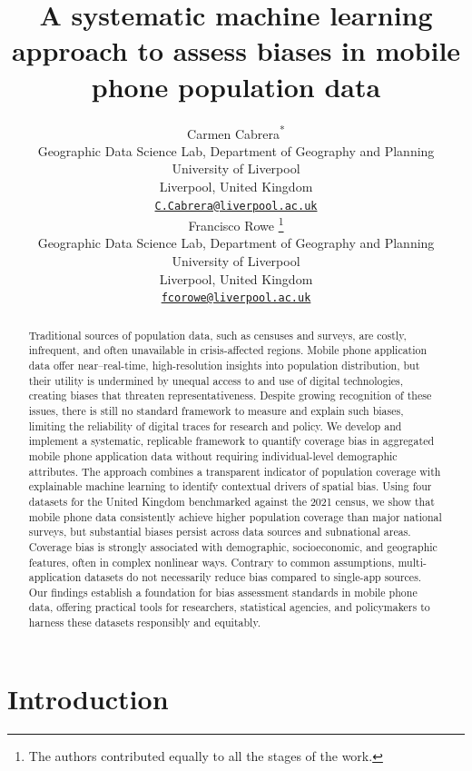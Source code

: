 \documentclass{article}
\title{A systematic machine learning approach to assess biases in mobile phone population data}
\author{
    Carmen Cabrera\textsuperscript{*}
   \\
    Geographic Data Science Lab, Department of Geography and Planning \\
    University of Liverpool \\
  Liverpool, United Kingdom \\
  \texttt{\href{mailto:C.Cabrera@liverpool.ac.uk}{\nolinkurl{C.Cabrera@liverpool.ac.uk}}} \\
   \And
    Francisco Rowe
    \thanks{The authors contributed equally to all the stages of the work.}
   \\
    Geographic Data Science Lab, Department of Geography and Planning \\
    University of Liverpool \\
  Liverpool, United Kingdom \\
  \texttt{\href{mailto:fcorowe@liverpool.ac.uk}{\nolinkurl{fcorowe@liverpool.ac.uk}}} \\
  }
\begin{document}
\maketitle


\begin{abstract}
Traditional sources of population data, such as censuses and surveys, are costly, infrequent, and often unavailable in crisis-affected regions. Mobile phone application data offer near--real-time, high-resolution insights into population distribution, but their utility is undermined by unequal access to and use of digital technologies, creating biases that threaten representativeness. Despite growing recognition of these issues, there is still no standard framework to measure and explain such biases, limiting the reliability of digital traces for research and policy. We develop and implement a systematic, replicable framework to quantify coverage bias in aggregated mobile phone application data without requiring individual-level demographic attributes. The approach combines a transparent indicator of population coverage with explainable machine learning to identify contextual drivers of spatial bias. Using four datasets for the United Kingdom benchmarked against the 2021 census, we show that mobile phone data consistently achieve higher population coverage than major national surveys, but substantial biases persist across data sources and subnational areas. Coverage bias is strongly associated with demographic, socioeconomic, and geographic features, often in complex nonlinear ways. Contrary to common assumptions, multi-application datasets do not necessarily reduce bias compared to single-app sources. Our findings establish a foundation for bias assessment standards in mobile phone data, offering practical tools for researchers, statistical agencies, and policymakers to harness these datasets responsibly and equitably.
\end{abstract}


\section{Introduction}\label{introduction}
\end{document}
